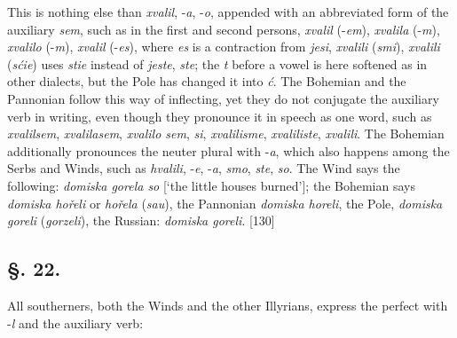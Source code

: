 This is nothing else than \textit{xvalil}, -\textit{a}, -\textit{o}, appended with an abbreviated form of the auxiliary \textit{sem}, such as in the first and second persons, \textit{xvalil} (-\textit{em}), \textit{xvalila} (-\textit{m}), \textit{xvalilo} (-\textit{m}), \textit{xvalil} (-\textit{es}), where \textit{es} is a contraction from \textit{jesi}, \textit{xvalili} (\textit{smi}), \textit{xvalili} (\textit{sćie}) uses \textit{stie} instead of \textit{jeste}, \textit{ste}; the \textit{t} before a vowel is here softened as in other dialects, but the Pole has changed it into \textit{ć}. The Bohemian and the Pannonian follow this way of inflecting, yet they do not conjugate the auxiliary verb in writing, even though they pronounce it in speech as one word, such as \textit{xvalilsem}, \textit{xvalilasem}, \textit{xvalilo sem}, \textit{si}, \textit{xvalilisme}, \textit{xvaliliste}, \textit{xvalili}. The Bohemian additionally pronounces the neuter plural with -\textit{a}, which also happens among the Serbs and Winds, such as \textit{hvalili}, -\textit{e}, -\textit{a}, \textit{smo}, \textit{ste}, \textit{so}. The Wind says the following: \textit{domiska gorela so} [‘the little houses burned’]; the Bohemian says \textit{domiska hořeli} or \textit{hořela} (\textit{sau}), the Pannonian \textit{domiska horeli}, the Pole, \textit{domiska goreli} (\textit{gorzeli}), the Russian: \textit{domiska goreli}. [130]

\subsection*{\hspace*{\fill}§. 22.\hspace*{\fill}}

All southerners, both the Winds and the other Illyrians, express the perfect with -\textit{l} and the auxiliary verb:

